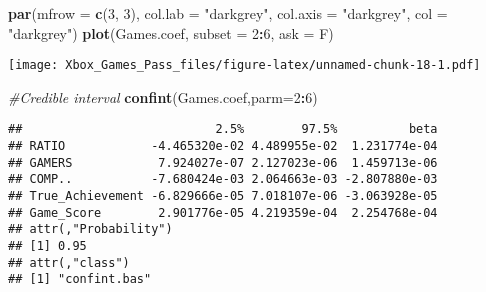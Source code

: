 \documentclass[
]{article}
\newenvironment{Shaded}{\begin{snugshade}}{\end{snugshade}}
\newcommand{\CommentTok}[1]{\textcolor[rgb]{0.56,0.35,0.01}{\textit{#1}}}
\newcommand{\DataTypeTok}[1]{\textcolor[rgb]{0.13,0.29,0.53}{#1}}
\newcommand{\DecValTok}[1]{\textcolor[rgb]{0.00,0.00,0.81}{#1}}
\newcommand{\KeywordTok}[1]{\textcolor[rgb]{0.13,0.29,0.53}{\textbf{#1}}}
\newcommand{\NormalTok}[1]{#1}
\newcommand{\OperatorTok}[1]{\textcolor[rgb]{0.81,0.36,0.00}{\textbf{#1}}}
\newcommand{\StringTok}[1]{\textcolor[rgb]{0.31,0.60,0.02}{#1}}
\begin{document}
\begin{Shaded}
\begin{Highlighting}[]
\KeywordTok{par}\NormalTok{(}\DataTypeTok{mfrow =} \KeywordTok{c}\NormalTok{(}\DecValTok{3}\NormalTok{, }\DecValTok{3}\NormalTok{), }\DataTypeTok{col.lab =} \StringTok{"darkgrey"}\NormalTok{, }\DataTypeTok{col.axis =} \StringTok{"darkgrey"}\NormalTok{, }\DataTypeTok{col =} \StringTok{"darkgrey"}\NormalTok{)}
\KeywordTok{plot}\NormalTok{(Games.coef, }\DataTypeTok{subset =} \DecValTok{2}\OperatorTok{:}\DecValTok{6}\NormalTok{, }\DataTypeTok{ask =}\NormalTok{ F)}
\end{Highlighting}
\end{Shaded}

\texttt{[image: Xbox\_Games\_Pass\_files/figure-latex/unnamed-chunk-18-1.pdf]}

\begin{Shaded}
\begin{Highlighting}[]
\CommentTok{#Credible interval}
\KeywordTok{confint}\NormalTok{(Games.coef,}\DataTypeTok{parm=}\DecValTok{2}\OperatorTok{:}\DecValTok{6}\NormalTok{)}
\end{Highlighting}
\end{Shaded}

\begin{verbatim}
##                           2.5%        97.5%          beta
## RATIO            -4.465320e-02 4.489955e-02  1.231774e-04
## GAMERS            7.924027e-07 2.127023e-06  1.459713e-06
## COMP..           -7.680424e-03 2.064663e-03 -2.807880e-03
## True_Achievement -6.829666e-05 7.018107e-06 -3.063928e-05
## Game_Score        2.901776e-05 4.219359e-04  2.254768e-04
## attr(,"Probability")
## [1] 0.95
## attr(,"class")
## [1] "confint.bas"
\end{verbatim}

\begin{Shaded}
\end{Shaded}
\end{document}
